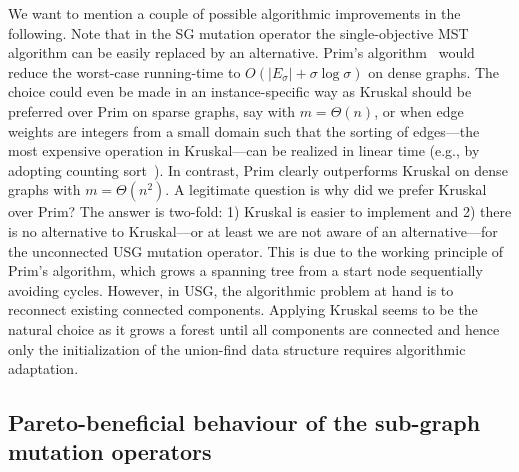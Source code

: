 \documentclass[twoside]{article}
\begin{document}
We want to mention a couple of possible algorithmic improvements in the following. Note that in the SG mutation operator the single-objective MST algorithm can be easily replaced by an alternative. Prim's algorithm~\citep{Prim57} would reduce the worst-case running-time to $O(|E_\sigma| + \sigma \log \sigma)$ on dense graphs. 
The choice could even be made in an instance-specific way as Kruskal should be preferred over Prim on sparse graphs, say with $m = \Theta(n)$, or when edge weights are integers from a small domain such that the sorting of edges---the most expensive operation in Kruskal---can be realized in linear time (e.g., by adopting counting sort~\citep{cormen2009IntroductionToAlgorithms}). In contrast, Prim clearly outperforms Kruskal on dense graphs with $m = \Theta(n^2)$.
A legitimate question is why did we prefer Kruskal over Prim? The answer is two-fold: 1) Kruskal is easier to implement and 2) there is no alternative to Kruskal---or at least we are not aware of an alternative---for the unconnected USG mutation operator. This is due to the working principle of Prim's algorithm, which grows a spanning tree from a start node sequentially avoiding cycles. However, in USG, the algorithmic problem at hand is to reconnect existing connected components. Applying Kruskal seems to be the natural choice as it grows a forest until all components are connected and hence only the initialization of the union-find data structure requires algorithmic adaptation.

\subsection{Pareto-beneficial behaviour of the sub-graph mutation operators}
\end{document}
